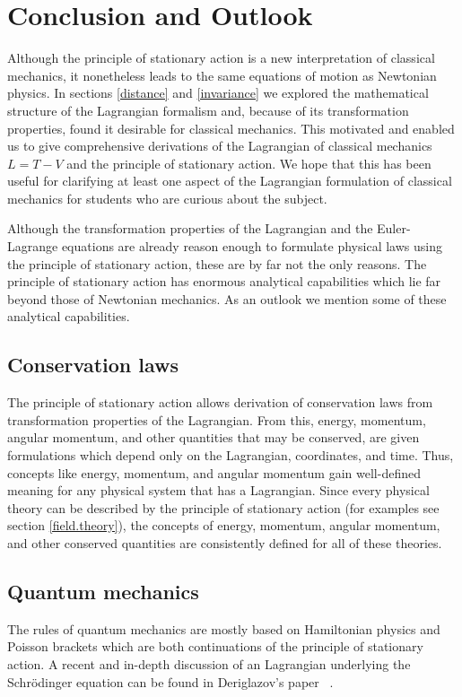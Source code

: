 \documentclass[prb,preprint]{revtex4-1}
\begin{document}
\section{Conclusion and Outlook}

Although the principle of stationary action is a new interpretation of classical mechanics, it nonetheless leads to the same equations of motion as Newtonian physics. In sections \ref{distance} and \ref{invariance} we explored the mathematical structure of the Lagrangian formalism and, because of its transformation properties, found it desirable for classical mechanics. This motivated and enabled us to give comprehensive derivations of the Lagrangian of classical mechanics $L=T-V$ and the principle of stationary action. We hope that this has been useful for clarifying at least one aspect of the Lagrangian formulation of classical mechanics for students who are curious about the subject.


Although the transformation properties of the Lagrangian and the Euler-Lagrange equations are already reason enough to formulate physical laws using the principle of stationary action, these are by far not the only reasons. The principle of stationary action has enormous analytical capabilities which lie far beyond those of Newtonian mechanics. As an outlook we mention some of these analytical capabilities.

\subsection{Conservation laws ~\cite{KleinertConservation}}
The principle of stationary action allows derivation of conservation laws from transformation properties of the Lagrangian. From this, energy, momentum, angular momentum, and other quantities that may be conserved, are given formulations which depend only on the Lagrangian, coordinates, and time. Thus, concepts like energy, momentum, and angular momentum gain well-defined meaning for any physical system that has a Lagrangian. Since every physical theory can be described by the principle of stationary action (for examples see section \ref{field.theory}), the concepts of energy, momentum, angular momentum, and other conserved quantities are consistently defined for all of these theories.

\subsection{Quantum mechanics ~\cite{Schwabl}}
The rules of quantum mechanics are mostly based on Hamiltonian physics and Poisson brackets which are both continuations of the principle of stationary action. A recent and in-depth discussion of an Lagrangian underlying the Schr{\"o}dinger equation can be found in Deriglazov's paper ~\cite{Deriglazov}.
\end{document}
